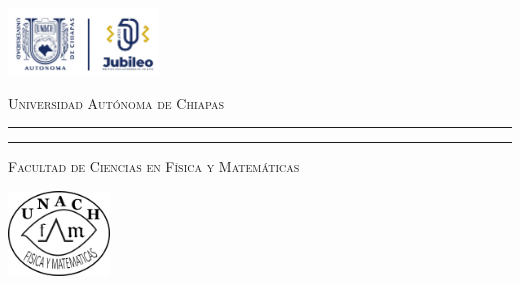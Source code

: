 \begin{titlepage}
\hspace{-1.7cm} %
\begin{minipage}[t][0.03\textheight][c]{0.22\textwidth}
        \includegraphics[width=4.0cm]{LOGO-JUBILEO.png}
\end{minipage}\hspace{0.9cm}
\begin{minipage}[t][0.03\textheight][c]{0.69\textwidth}
\begin{center}
                \textsc{\huge Universidad Autónoma de Chiapas}\\[0.3cm]
                \hrule height 2.5pt
                \vspace{0.2cm}
                \hrule height1pt
                \vspace{0.3cm}
                \textsc{\Large Facultad de Ciencias en Física y Matemáticas}
\end{center}
\end{minipage}\hspace{0.2cm}
\begin{minipage}[t][0.03\textheight][c]{0.2\textwidth}
		\includegraphics[width=2.7cm]{FCFMLOGO.png}
\end{minipage}\\
\begin{minipage}[t][0.93\textheight][c]{0.06\textwidth}
\vspace{60pt}
    \begin{center}
        \vrule width1pt height18cm
        \vspace{5mm}
        \vrule width2.5pt height18cm
        \vspace{5mm}
        \vrule width1pt height18cm
   \end{center}
\end{minipage}\hspace{1.3cm} %
\begin{minipage}[t][0.95\textheight][c]{0.76\textwidth}


\end{minipage}
\end{titlepage}
